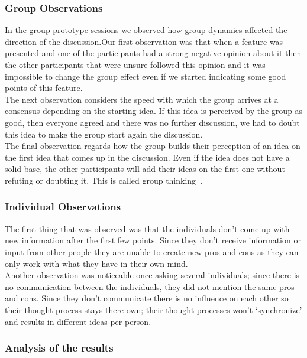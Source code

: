 \documentclass[main.tex]{subfiles}
\begin{document}
\subsubsection{Group Observations}

In the group prototype sessions we observed how group dynamics affected the direction of the discussion.Our first observation was that when a feature was presented and one of the participants had a strong negative opinion about it then the other participants that were unsure followed this opinion and it was impossible to change the group effect even if we started indicating some good points of this feature. \\

The next observation considers the speed with which the group arrives at a consensus depending on the starting idea. If this idea is perceived by the group as good, then everyone agreed and there was no further discussion, we had to doubt this idea to make the group start again the discussion.\\

The final observation regards how the group builds their perception of an idea on the first idea that comes up in the discussion. Even if the idea does not have a solid base, the other participants will add their ideas on the first one without refuting or doubting it. This is called group thinking~\cite{janis}.

\subsubsection{Individual Observations}
The first thing that was observed was that the individuals don't come up with new information after the first few points. Since they don't receive information or input from other people they are unable to create new pros and cons as they can only work with what they have in their own mind. \\
Another observation was noticeable once asking several individuals; since there is no communication between the individuals, they did not mention the same pros and cons. Since they don't communicate there is no influence on each other so their thought process stays there own; their thought processes won't `synchronize' and results in different ideas per person.

\subsubsection{Analysis of the results}
\end{document}

